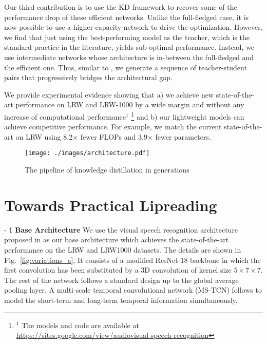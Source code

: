 \documentclass{article}
\begin{document}
Our third contribution is to use the KD framework to recover some of the performance drop of these efficient networks. Unlike the full-fledged case, it is now possible to use a higher-capacity network to drive the optimization. However, we find that just using the best-performing model as the teacher, which is the standard practice in the literature, yields sub-optimal performance. Instead, we use intermediate networks whose architecture is in-between the full-fledged and the efficient one. Thus, similar to \cite{Martinez2020Training}, we generate a sequence of teacher-student pairs that progressively bridges the architectural gap.

We provide experimental evidence showing that a) we achieve new state-of-the-art performance on LRW \cite{chung16b} and LRW-1000 \cite{lrw1000} by a wide margin and without any increase of computational performance$^1$ \footnote{$^1$ The models and code are available at \url{https://sites.google.com/view/audiovisual-speech-recognition}} and b) our lightweight models can achieve competitive performance. For example, we match the current state-of-the-art on LRW \cite{martinez2020lipreading} using 8.2$\times$ fewer FLOPs and 3.9$\times$ fewer parameters.


\begin{figure}[t]
    \centering
    \texttt{[image: ./images/architecture.pdf]}
    \caption[architecture]{The pipeline of knowledge distillation in generations}
\label{fig:pipeline}
\vspace{-2mm}
\end{figure}




\section{Towards Practical Lipreading}
\label{sec:Architecture}
\looseness - 1
\noindent\textbf{Base Architecture}\quad
We use the visual speech recognition architecture proposed in \cite{martinez2020lipreading} as our base architecture  which achieves the state-of-the-art performance on the LRW and LRW1000 datasets. The details are shown in Fig.~\ref{fig:variations_a}. It consists of a modified ResNet-18 backbone in which the first convolution has been substituted by a 3D convolution of kernel size $5\times 7\times 7$. The rest of the network follows a standard design up to the global average pooling layer. A multi-scale temporal convolutional network (MS-TCN) follows to model the short-term and long-term temporal information simultaneously.
\end{document}
